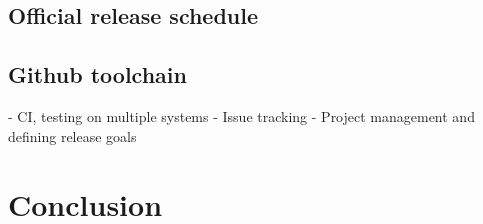\documentclass[a4paper]{spie}  %
\begin{document}
 
\subsection{Official release schedule}
\label{ssec:dev_releases}



\subsection{Github toolchain}
\label{ssec:dev_testing}
	- CI, testing on multiple systems
	- Issue tracking
	- Project management and defining release goals

\section{Conclusion}
\label{sec:conclusion}
\lipsum[5-6]





\appendix    %

\acknowledgments %
\lipsum[7]

\end{document}
